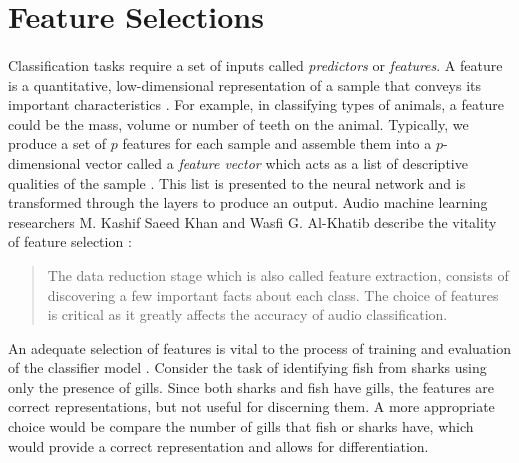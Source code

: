 \documentclass[12pt,letterpaper]{article}
\begin{document}

\newpage
\section{Feature Selections}
\label{sec-Features}

\paragraph*{}Classification tasks require a set of inputs called \textit{predictors} or \textit{features}. A feature is a quantitative, low-dimensional representation of a sample that conveys its important characteristics \cite{James,Loy,Virtanen}. For example, in classifying types of animals, a feature could be the mass, volume or number of teeth on the animal. Typically, we produce a set of $p$ features for each sample and assemble them into a $p$-dimensional vector called a \textit{feature vector} which acts as a list of descriptive qualities of the sample \cite{Geron,James}. This list is presented to the neural network and is transformed through the layers to produce an output. Audio machine learning researchers M. Kashif Saeed Khan and Wasfi G. Al-Khatib describe the vitality of feature selection \cite{Khan}:
\begin{quote}
The data reduction stage which is also called feature extraction, consists of discovering a few important facts about each class. The choice of features is critical as it greatly affects the accuracy of audio classification. 
\end{quote}
An adequate selection of features is vital to the process of training and evaluation of the classifier model \cite{Mierswa,Serizel,Liu}. Consider the task of identifying fish from sharks using only the presence of gills. Since both sharks and fish have gills, the features are correct representations, but not useful for discerning them. A more appropriate choice would be compare the number of gills that fish or sharks have, which would provide a correct representation and allows for differentiation.
\end{document}

